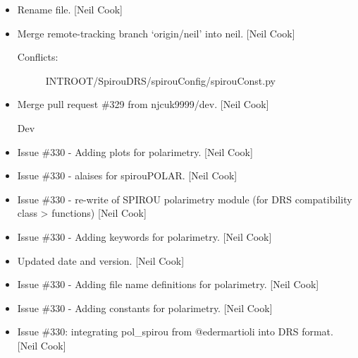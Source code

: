 \documentclass[a4paper,10pt,english]{report}
\begin{document}
\begin{itemize}
\item {} 
Rename file. {[}Neil Cook{]}

\item {} 
Merge remote-tracking branch ‘origin/neil’ into neil. {[}Neil Cook{]}
\begin{description}
\item[{Conflicts:}] \leavevmode
INTROOT/SpirouDRS/spirouConfig/spirouConst.py

\end{description}

\item {} 
Merge pull request \#329 from njcuk9999/dev. {[}Neil Cook{]}

Dev

\item {} 
Issue \#330 - Adding plots for polarimetry. {[}Neil Cook{]}

\item {} 
Issue \#330 - alaises for spirouPOLAR. {[}Neil Cook{]}

\item {} 
Issue \#330 - re-write of SPIROU polarimetry module (for DRS
compatibility class \textendash{}\textgreater{} functions) {[}Neil Cook{]}

\item {} 
Issue \#330 - Adding keywords for polarimetry. {[}Neil Cook{]}

\item {} 
Updated date and version. {[}Neil Cook{]}

\item {} 
Issue \#330 - Adding file name definitions for polarimetry. {[}Neil Cook{]}

\item {} 
Issue \#330 - Adding constants for polarimetry. {[}Neil Cook{]}

\item {} 
Issue \#330: integrating pol\_spirou from @edermartioli into DRS format.
{[}Neil Cook{]}

\end{itemize}
\end{document}
